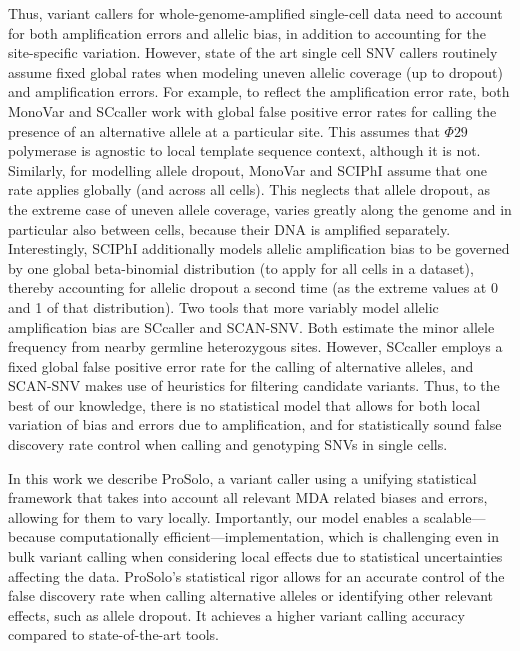 \documentclass[12pt,inline]{wlscirep}
\begin{document}
Thus, variant callers for whole-genome-amplified single-cell data need to account for both amplification errors and allelic bias, in addition to accounting for the site-specific variation.
However, state of the art single cell SNV callers routinely assume fixed global rates when modeling uneven allelic coverage (up to dropout) and amplification errors. 
For example, to reflect the amplification error rate, both MonoVar\cite{zafar_monovar:_2016} and SCcaller\cite{dong_accurate_2017} work with global false positive error rates for calling the presence of an alternative allele at a particular site.
This assumes that $\Phi29$ polymerase is agnostic to local template sequence context, although it is not\cite{de_paz_high-resolution_2018}.
Similarly, for modelling allele dropout, MonoVar\cite{zafar_monovar:_2016} and SCIPhI\cite{singer_single-cell_2018} assume that one rate applies globally (and across all cells).
This neglects that allele dropout, as the extreme case of uneven allele coverage, varies greatly along the genome and in particular also between cells, because their DNA is amplified separately.
Interestingly, SCIPhI\cite{singer_single-cell_2018} additionally models allelic amplification bias to be governed by one global beta-binomial distribution (to apply for all cells in a dataset), thereby accounting for allelic dropout a second time (as the extreme values at 0 and 1 of that distribution).
Two tools that more variably model allelic amplification bias are SCcaller \cite{dong_accurate_2017} and SCAN-SNV\cite{luquette_identification_2019}.
Both estimate the minor allele frequency from nearby germline heterozygous sites. 
However, SCcaller employs a fixed global false positive error rate for the calling of alternative alleles\cite{dong_accurate_2017}, and SCAN-SNV makes use of heuristics for filtering candidate variants\cite{luquette_identification_2019}.
Thus, to the best of our knowledge, there is no statistical model that allows for both local variation of bias and errors due to amplification, and for statistically sound false discovery rate control when calling and genotyping SNVs in single cells.

In this work we describe ProSolo, a variant caller using a unifying statistical framework that takes into account all relevant MDA related biases and errors, allowing for them to vary locally.
Importantly, our model enables a scalable---because computationally efficient---implementation, which is challenging even in bulk variant calling when considering local effects due to statistical uncertainties affecting the data\cite{koster_varlociraptor_2020}.
ProSolo's statistical rigor allows for an accurate control of the false discovery rate when calling alternative alleles or identifying other relevant effects, such as allele dropout.
It achieves a higher variant calling accuracy compared to state-of-the-art tools.
\end{document}
